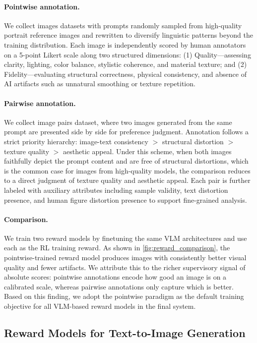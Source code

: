 \documentclass{llmxive}
\begin{document}
\paragraph{Pointwise annotation.} We collect images datasets with prompts randomly sampled from high-quality portrait reference images and rewritten to diversify linguistic patterns beyond the training distribution. Each image is independently scored by human annotators on a 5-point Likert scale along two structured dimensions: (1) Quality---assessing clarity, lighting, color balance, stylistic coherence, and material texture; and (2) Fidelity---evaluating structural correctness, physical consistency, and absence of AI artifacts such as unnatural smoothing or texture repetition.

\paragraph{Pairwise annotation.} We collect image pairs dataset, where two images generated from the same prompt are presented side by side for preference judgment. Annotation follows a strict priority hierarchy: image-text consistency $>$ structural distortion $>$ texture quality $>$ aesthetic appeal. Under this scheme, when both images faithfully depict the prompt content and are free of structural distortions, which is the common case for images from high-quality models, the comparison reduces to a direct judgment of texture quality and aesthetic appeal. Each pair is further labeled with auxiliary attributes including sample validity, text distortion presence, and human figure distortion presence to support fine-grained analysis.

\paragraph{Comparison.} We train two reward models by finetuning the same VLM architectures and use each as the RL training reward. As shown in \cref{fig:reward_comparison}, the pointwise-trained reward model produces images with consistently better visual quality and fewer artifacts. We attribute this to the richer supervisory signal of absolute scores: pointwise annotations encode how good an image is on a calibrated scale, whereas pairwise annotations only capture which is better. Based on this finding, we adopt the pointwise paradigm as the default training objective for all VLM-based reward models in the final system.


\subsection{Reward Models for Text-to-Image Generation}
\label{sec:reward_t2i}
\end{document}

